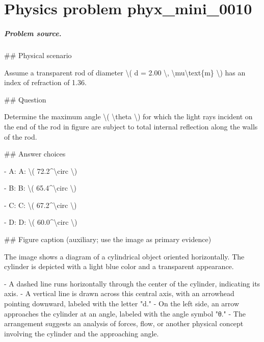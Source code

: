 
\chapter{Physics problem phyx\_mini\_0010}
\label{ch:PhyXMiniProblems_problem_phyx_mini_0010}

\paragraph{Problem source.}
\#\# Physical scenario

Assume a transparent rod of diameter \textbackslash{}( d = 2.00 \textbackslash{}, \textbackslash{}mu\textbackslash{}text\{m\} \textbackslash{}) has an index of refraction of 1.36.

\#\# Question

Determine the maximum angle \textbackslash{}( \textbackslash{}theta \textbackslash{}) for which the light rays incident on the end of the rod in figure are subject to total internal reflection along the walls of the rod.

\#\# Answer choices

- A: A: \textbackslash{}( 72.2\textasciicircum{}\textbackslash{}circ \textbackslash{})

- B: B: \textbackslash{}( 65.4\textasciicircum{}\textbackslash{}circ \textbackslash{})

- C: C: \textbackslash{}( 67.2\textasciicircum{}\textbackslash{}circ \textbackslash{})

- D: D: \textbackslash{}( 60.0\textasciicircum{}\textbackslash{}circ \textbackslash{})

\#\# Figure caption (auxiliary; use the image as primary evidence)

The image shows a diagram of a cylindrical object oriented horizontally. The cylinder is depicted with a light blue color and a transparent appearance. 

- A dashed line runs horizontally through the center of the cylinder, indicating its axis.
- A vertical line is drawn across this central axis, with an arrowhead pointing downward, labeled with the letter "d."
- On the left side, an arrow approaches the cylinder at an angle, labeled with the angle symbol "θ."
- The arrangement suggests an analysis of forces, flow, or another physical concept involving the cylinder and the approaching angle.

